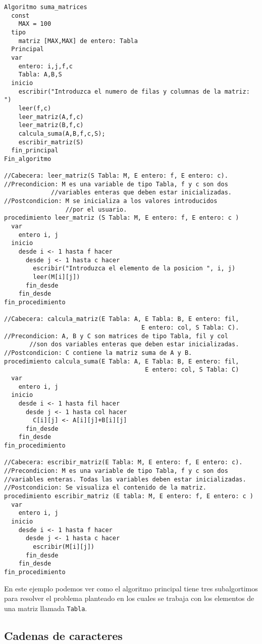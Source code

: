 \documentclass[12pt,letterpaper]{article}
\begin{document}
\begin{lstlisting}
Algoritmo suma_matrices
  const
    MAX = 100
  tipo
    matriz [MAX,MAX] de entero: Tabla
  Principal
  var
    entero: i,j,f,c
    Tabla: A,B,S
  inicio
    escribir("Introduzca el numero de filas y columnas de la matriz: ")
    leer(f,c)
    leer_matriz(A,f,c)
    leer_matriz(B,f,c)
    calcula_suma(A,B,f,c,S);
    escribir_matriz(S)
  fin_principal
Fin_algoritmo
	
//Cabecera: leer_matriz(S Tabla: M, E entero: f, E entero: c).
//Precondicion: M es una variable de tipo Tabla, f y c son dos
             //variables enteras que deben estar inicializadas.
//Postcondicion: M se inicializa a los valores introducidos
                 //por el usuario.
procedimiento leer_matriz (S Tabla: M, E entero: f, E entero: c )
  var
    entero i, j
  inicio
    desde i <- 1 hasta f hacer
      desde j <- 1 hasta c hacer
        escribir("Introduzca el elemento de la posicion ", i, j)
        leer(M[i][j])
      fin_desde
    fin_desde
fin_procedimiento
	
//Cabecera: calcula_matriz(E Tabla: A, E Tabla: B, E entero: fil,
                                      E entero: col, S Tabla: C).
//Precondicion: A, B y C son matrices de tipo Tabla, fil y col
       //son dos variables enteras que deben estar inicializadas.
//Postcondicion: C contiene la matriz suma de A y B.
procedimiento calcula_suma(E Tabla: A, E Tabla: B, E entero: fil,
                                       E entero: col, S Tabla: C)
  var
    entero i, j
  inicio
    desde i <- 1 hasta fil hacer
      desde j <- 1 hasta col hacer
        C[i][j] <- A[i][j]+B[i][j]
      fin_desde
    fin_desde
fin_procedimiento
	
//Cabecera: escribir_matriz(E Tabla: M, E entero: f, E entero: c).
//Precondicion: M es una variable de tipo Tabla, f y c son dos
//variables enteras. Todas las variables deben estar inicializadas.
//Postcondicion: Se visualiza el contenido de la matriz.
procedimiento escribir_matriz (E tabla: M, E entero: f, E entero: c )
  var
    entero i, j
  inicio
    desde i <- 1 hasta f hacer
      desde j <- 1 hasta c hacer
        escribir(M[i][j])
      fin_desde
    fin_desde
fin_procedimiento
\end{lstlisting}
En este ejemplo podemos ver como el algoritmo principal tiene tres subalgortimos para resolver el problema planteado en los cuales se trabaja con los elementos de una matriz llamada \texttt{Tabla}.

\subsection{Cadenas de caracteres}
\end{document}
